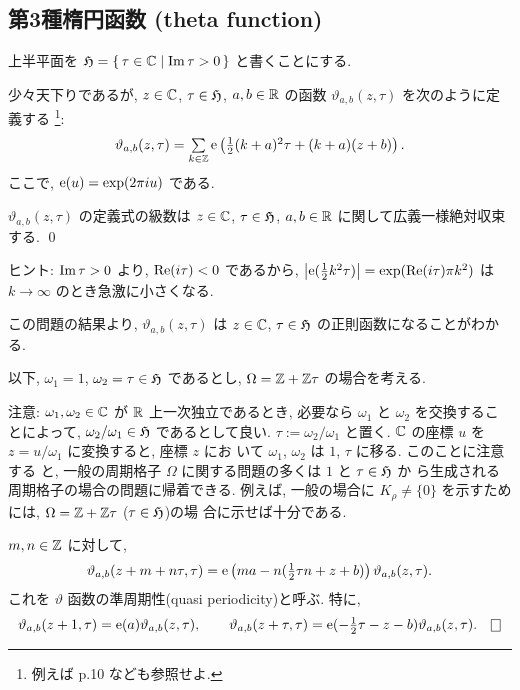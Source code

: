 \documentclass[12pt,twoside]{jarticle}
\def\e{{\text{\rm e}}}
\def\vt{\vartheta}
\def\H{{\frak H}}
\def\Z{{\Bbb Z}} %
\def\R{{\Bbb R}} %
\def\C{{\Bbb C}} %
\def\Repart{\mathop{\text{\rm Re}}\nolimits} %
\def\Impart{\mathop{\text{\rm Im}}\nolimits} %
\begin{document}

\subsection{第3種楕円函数 (theta function)}

上半平面を $\H=\{\,\tau\in\C\mid\Impart\tau>0\,\}$ と書くことにする.

少々天下りであるが, $z\in\C$, $\tau\in\H$, $a,b\in\R$ の函数 %
$\vt_{a,b}(z,\tau)$ を次のように定義する%
\footnote{例えば \cite{TataI} p.10 なども参照せよ.}:
\[
  \textstyle
  \vt_{a,b}(z,\tau)
  = \sum\limits_{k\in\Z}
    \e\left(
      \frac{1}{2}(k+a)^2\tau + (k+a)(z+b)
    \right).
\]
ここで, $\e(u)=\exp(2\pi i u)$ である. 

\begin{question}
  $\vt_{a,b}(z,\tau)$ の定義式の級数は $z\in\C$, $\tau\in\H$,
  $a,b\in\R$ に関して広義一様絶対収束する. \qed
\end{question}

\noindent ヒント: $\Impart\tau>0$ より, $\Repart(i\tau)<0$ であるから,
$\left|\e(\frac{1}{2}k^2\tau)\right| = \exp(\Repart(i\tau)\pi k^2)$ は %
$k\to\infty$ のとき急激に小さくなる.

\medskip

\noindent この問題の結果より, $\vt_{a,b}(z,\tau)$ は $z\in\C$, %
$\tau\in\H$ の正則函数になることがわかる.

\medskip

以下, $\omega_1=1$, $\omega_2=\tau\in\H$ であるとし, %
$\Omega=\Z+\Z\tau$ の場合を考える.

\medskip

\noindent 注意: $\omega_1,\omega_2\in\C$ が $\R$ 上一次独立であるとき,
必要なら $\omega_1$ と $\omega_2$ を交換することによって, %
$\omega_2/\omega_1\in\H$ であるとして良い. $\tau:=\omega_2/\omega_1$ %
と置く. $\C$ の座標 $u$ を $z=u/\omega_1$ に変換すると, 座標 $z$ にお
いて $\omega_1$, $\omega_2$ は $1$, $\tau$ に移る. このことに注意する
と, 一般の周期格子 $\Omega$ に関する問題の多くは $1$ と $\tau\in\H$ か
ら生成される周期格子の場合の問題に帰着できる. 例えば, 一般の場合に %
$K_\rho\ne\{0\}$ を示すためには, $\Omega=\Z+\Z\tau$ ($\tau\in\H$)の場
合に示せば十分である.

\begin{question}[テータ函数の準周期性]
  $m,n\in\Z$ に対して,
  \[
  \textstyle
    \vt_{a,b}(z+m+n\tau,\tau)
    = \e\left(ma - n(\frac{1}{2}\tau n + z + b)\right) \vt_{a,b}(z,\tau).
  \] %
  これを $\vt$ 函数の準周期性(quasi periodicity)と呼ぶ. 特に,
  \[
  \textstyle
    \vt_{a,b}(z+1,\tau)=\e(a)\vt_{a,b}(z,\tau),
    \qquad
    \vt_{a,b}(z+\tau,\tau)=\e(-\frac{1}{2}\tau-z-b)\vt_{a,b}(z,\tau).
    \qed
  \]
\end{question}
\end{document}
